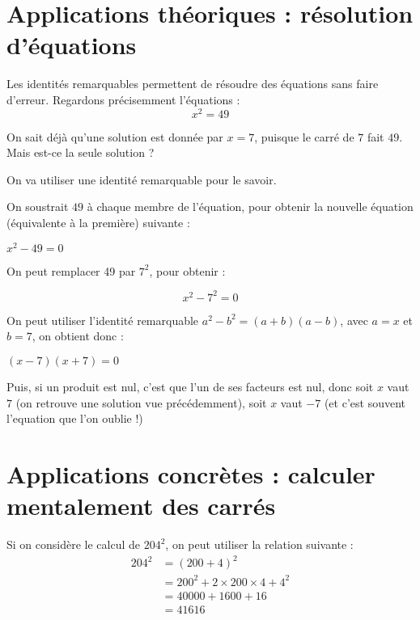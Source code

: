 \documentclass[11pt]{article}
\begin{document}
\section{Applications théoriques : résolution d'équations}
\label{sec:org4705751}
Les identités remarquables permettent de résoudre des équations sans faire
d'erreur. Regardons précisemment l'équations :
\[
    x^{2} = 49
\]

On sait déjà qu'une solution est donnée par \(x = 7\), puisque le carré de \(7\)
fait \(49\). Mais est-ce la seule solution ?

On va utiliser une identité remarquable pour le savoir.

\begin{meth}
  On soustrait $49$ à chaque membre de l'équation, pour obtenir la nouvelle
  équation (équivalente à la première) suivante :

  \(
  x^{2} - 49 = 0
  \)

  On peut
  remplacer 49 par $7^{2}$, pour obtenir :

  \[
    x^{2} - 7^{2} = 0
  \]

  On peut utiliser l'identité remarquable $a^{2} - b^{2} = (a+b)(a-b)$, avec $a =
  x$ et $b = 7$, on obtient donc :

  \(
    (x-7)(x+7) = 0
  \)

  Puis, si un produit est nul, c'est
  que l'un de ses facteurs est nul, donc soit $x$ vaut $7$ (on retrouve une
  solution vue précédemment), soit $x$ vaut $-7$ (et c'est souvent l'equation que
  l'on oublie !)
\end{meth}

\section{Applications concrètes : calculer mentalement des carrés}
\label{sec:orgbe3b97e}

Si on considère le calcul de \(204^{2}\), on peut utiliser la relation suivante :
\begin{align*}
  204^{2} &= (200 + 4)^{2} \\
          &= 200^{2}+2 \times 200 \times 4 + 4^{2}\\
          &=  40000 + 1600 + 16 \\
          &= 41616
\end{align*}
\end{document}
